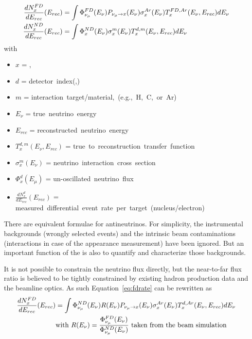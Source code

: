 \begin{align}
\label{eq:fdrate}
\frac{dN^{FD}_{x}}{dE_{rec}}(E_{rec}) & = 
\int \Phi^{FD}_{\nu_\mu}(E_\nu)P_{\nu_\mu\rightarrow x}(E_\nu)\sigma^{Ar}_x(E_\nu)T^{FD,Ar}_x(E_\nu,E_{rec})dE_\nu\\
\frac{dN^{ND}_{x}}{dE_{rec}}(E_{rec}) & = 
\int \Phi^{ND}_{x}(E_\nu)\sigma^m_x(E_\nu)T^{d,m}_x(E_\nu,E_{rec})dE_\nu\\
\end{align}
with
\begin{itemize}
    \item $x$  = \nue , \numu 
   \item $d$  = \mbox{detector index}(,) 
   \item $m$  = \mbox{interaction target/material, (e.g., H, C, or Ar)}
   \item $E_\nu$  = \mbox{true neutrino energy}
   \item $E_{rec}$  = \mbox{reconstructed neutrino energy} 
   \item $T^{d,m}_x(E_\nu,E_{rec})$  = \mbox{true to reconstruction transfer function} 
   \item $\sigma^m_x(E_\nu)$  = \mbox{neutrino interaction cross section} 
   \item $\Phi^{d}_x(E_\mu)$  = \mbox{un-oscillated neutrino flux} 
   \item $\frac{dN^{d}_{x}}{dE_{rec}}(E_{rec})$  = \mbox{measured differential event rate per target (nucleus/electron)} 
\end{itemize}


There are equivalent formulae for antineutrinos. For simplicity, the instrumental backgrounds (wrongly selected events) and the intrinsic beam contaminations (\nue interactions in case of the appearance measurement) have been ignored. But an important function of the   is also to quantify and characterize those backgrounds.

It is not possible to constrain the  neutrino flux directly, but the near-to-far flux ratio is believed to be tightly constrained by existing hadron production data and the beamline optics. As such Equation~\ref{eq:fdrate} can be rewritten as 
\begin{align}
\frac{dN^{FD}_{x}}{dE_{rec}}(E_{rec}) & = 
\int \Phi^{ND}_{\nu_\mu}(E_\nu)R(E_\nu)P_{\nu_\mu\rightarrow x}(E_\nu)\sigma^{Ar}_x(E_\nu)T^{d,Ar}_x(E_\nu,E_{rec})dE_\nu\\
& \mbox{with } R(E_\nu) = \frac{\Phi^{FD}_{\nu_\mu}(E_\nu)}{\Phi^{ND}_{\nu_\mu}(E_\nu)} \mbox{ taken from the beam simulation} \nonumber
\end{align}


